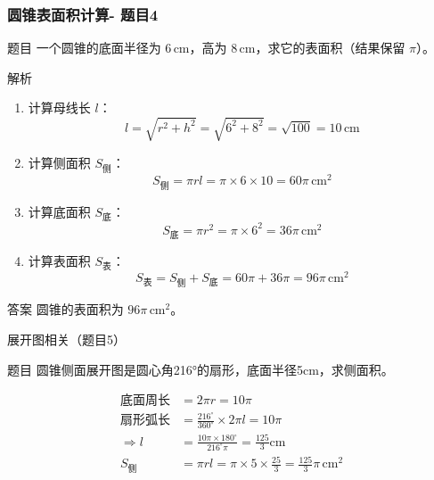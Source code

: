 \begin{frame}
    \frametitle{圆锥表面积计算- 题目4}
    
    \begin{block}{题目}
        一个圆锥的底面半径为 \(6 \, \text{cm}\)，高为 \(8 \, \text{cm}\)，求它的表面积（结果保留 \(\pi\)）。
    \end{block}
    

\end{frame}
\begin{frame}

    \begin{block}{解析}
        \begin{enumerate}
            \item 计算母线长 \( l \)：
            \[
            l = \sqrt{r^2 + h^2} = \sqrt{6^2 + 8^2} = \sqrt{100} = 10 \, \text{cm}
            \]
            
            \item 计算侧面积 \( S_{\text{侧}} \)：
            \[
            S_{\text{侧}} = \pi r l = \pi \times 6 \times 10 = 60\pi \, \text{cm}^2
            \]
            
            \item 计算底面积 \( S_{\text{底}} \)：
            \[
            S_{\text{底}} = \pi r^2 = \pi \times 6^2 = 36\pi \, \text{cm}^2
            \]
            
            \item 计算表面积 \( S_{\text{表}} \)：
            \[
            S_{\text{表}} = S_{\text{侧}} + S_{\text{底}} = 60\pi + 36\pi = 96\pi \, \text{cm}^2
            \]
        \end{enumerate}
    \end{block}

    \begin{alertblock}{答案}
        圆锥的表面积为 \(\boxed{96\pi \, \text{cm}^2}\)。
    \end{alertblock}
\end{frame}



\begin{frame}{展开图相关（题目5）}
    \begin{block}{题目}
    圆锥侧面展开图是圆心角216°的扇形，底面半径5cm，求侧面积。
    \end{block}
    \pause
    
    \begin{align*}
    \text{底面周长} &= 2\pi r = 10\pi \\
    \text{扇形弧长} &= \frac{216^\circ}{360^\circ} \times 2\pi l = 10\pi \\
    \Rightarrow l &= \frac{10\pi \times 180^\circ}{216^\circ \pi} = \frac{125}{3}\text{cm} \\
    S_{\text{侧}} &= \pi r l = \pi \times 5 \times \frac{25}{3} = \frac{125}{3}\pi \,\text{cm}^2
    \end{align*}

    \end{frame}



